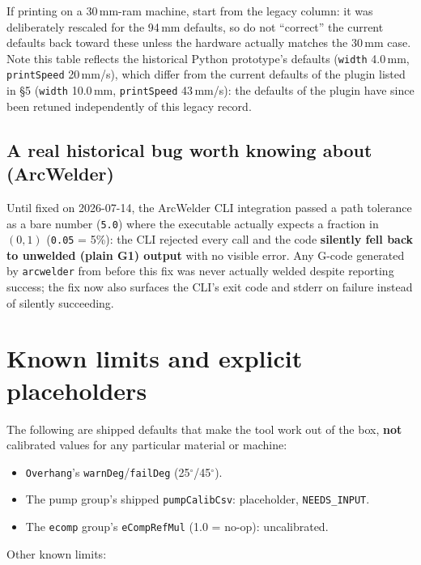 \documentclass[11pt]{article}
\newcommand{\param}[1]{\texttt{#1}}
\newcommand{\iamdeg}{$^{\circ}$}
\begin{document}
If printing on a 30\,mm-ram machine, start from the legacy column: it
was deliberately rescaled for the 94\,mm defaults, so do not ``correct''
the current defaults back toward these unless the hardware actually
matches the 30\,mm case. Note this table reflects the historical Python
prototype's defaults (\param{width} 4.0\,mm, \param{printSpeed}
20\,mm/s), which differ from the current defaults of the plugin listed
in \S 5 (\param{width} 10.0\,mm, \param{printSpeed} 43\,mm/s): the defaults of the plugin have since been retuned independently of this legacy
record.

\subsection{A real historical bug worth knowing about (ArcWelder)}

Until fixed on 2026-07-14, the ArcWelder CLI integration passed a path
tolerance as a bare number (\texttt{5.0}) where the executable actually
expects a fraction in $(0,1)$ (\texttt{0.05} = 5\%): the CLI rejected
every call and the code \textbf{silently fell back to unwelded (plain
G1) output} with no visible error. Any G-code generated by
\param{arcwelder} from before this fix was never actually welded despite
reporting success; the fix now also surfaces the CLI's exit code and
stderr on failure instead of silently succeeding.

\section{Known limits and explicit placeholders}

The following are shipped defaults that make the tool work out of the
box, \textbf{not} calibrated values for any particular material or
machine:

\begin{itemize}
  \item \param{Overhang}'s \param{warnDeg}/\param{failDeg} (25\iamdeg/45\iamdeg).
  \item The pump group's shipped \param{pumpCalibCsv}: placeholder, \texttt{NEEDS\_INPUT}.
  \item The \param{ecomp} group's \param{eCompRefMul} (1.0 = no-op): uncalibrated.
\end{itemize}

Other known limits:
\end{document}
